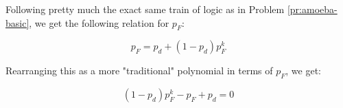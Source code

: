 Following pretty much the exact same train of logic as in Problem \ref{pr:amoeba-basic}, we get the following relation for $p_F$:

\begin{equation}
p_F = p_d + (1-p_d)p_F^k
\end{equation}

Rearranging this as a more "traditional" polynomial in terms of $p_F$, we get:

\begin{equation}
(1-p_d)p_F^k - p_F + p_d = 0
\end{equation}





